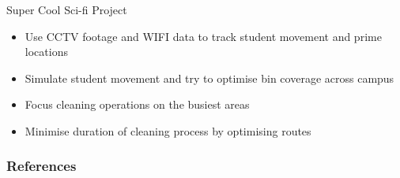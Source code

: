 \documentclass[18pt]{beamer}
\begin{document}
    \begin{frame}{Super Cool Sci-fi Project}
        \begin{itemize}
            \item Use CCTV footage and WIFI data to track student movement and prime locations \pause
            \item Simulate student movement and try to optimise bin coverage across campus \pause
            \item Focus cleaning operations on the busiest areas \pause
            \item Minimise duration of cleaning process by optimising routes
        \end{itemize}
    \end{frame}

    \begin{frame}[allowframebreaks]
            \frametitle{References}
            
            
    \end{frame}
\end{document}
